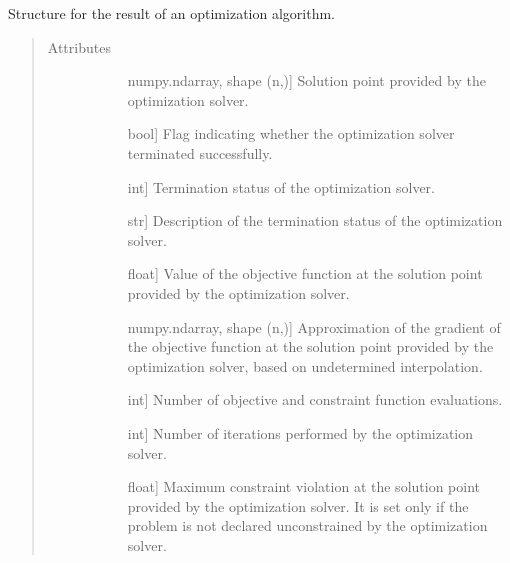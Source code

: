 \documentclass[letterpaper,10pt,english]{sphinxmanual}
\begin{document}
\begin{fulllineitems}
\label{\detokenize{refs/generated/cobyqa.OptimizeResult:cobyqa.OptimizeResult}}
\sphinxAtStartPar
Structure for the result of an optimization algorithm.
\begin{quote}\begin{description}
\item[{Attributes}] \leavevmode\begin{description}
\item[{}] \leavevmode{[}numpy.ndarray, shape (n,){]}
\sphinxAtStartPar
Solution point provided by the optimization solver.

\item[{}] \leavevmode{[}bool{]}
\sphinxAtStartPar
Flag indicating whether the optimization solver terminated successfully.

\item[{}] \leavevmode{[}int{]}
\sphinxAtStartPar
Termination status of the optimization solver.

\item[{}] \leavevmode{[}str{]}
\sphinxAtStartPar
Description of the termination status of the optimization solver.

\item[{}] \leavevmode{[}float{]}
\sphinxAtStartPar
Value of the objective function at the solution point provided by the
optimization solver.

\item[{}] \leavevmode{[}numpy.ndarray, shape (n,){]}
\sphinxAtStartPar
Approximation of the gradient of the objective function at the solution
point provided by the optimization solver, based on undetermined
interpolation.

\item[{}] \leavevmode{[}int{]}
\sphinxAtStartPar
Number of objective and constraint function evaluations.

\item[{}] \leavevmode{[}int{]}
\sphinxAtStartPar
Number of iterations performed by the optimization solver.

\item[{}] \leavevmode{[}float{]}
\sphinxAtStartPar
Maximum constraint violation at the solution point provided by the
optimization solver. It is set only if the problem is not declared
unconstrained by the optimization solver.


\end{description}
\end{description}
\end{quote}
\end{fulllineitems}
\end{document}
